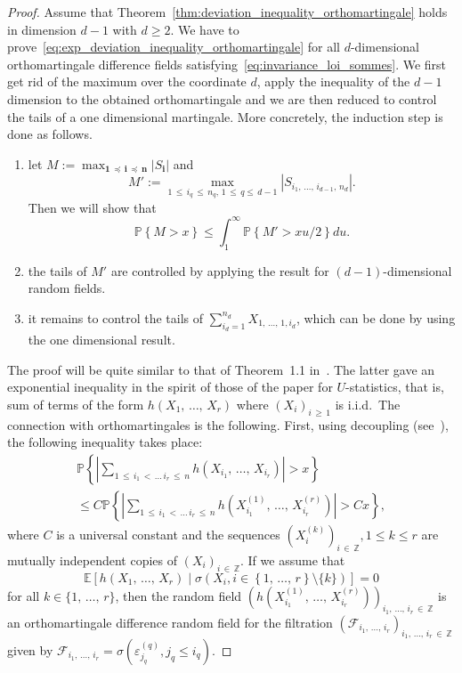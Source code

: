 \documentclass[AHL,Unicode,longabstracts,published]{cedram}
\newcommand{\Fca}{\mathcal{F}}
\newcommand\PP{\mathbb{P}}
\newcommand\Z{\mathbb{Z}}
\newcommand{\bbE}{\mathbb{E}}
\newcommand\ens[1]{\{ #1\}}
\newcommand\abs[1]{|#1|}
\newcommand{\pr}[1]{(#1)}
\newcommand\eps{\varepsilon}
\newcommand{\gr}[1]{\bm{#1}}
\newcommand{\gri}{\bm{i}}
\newcommand{\imd}{\preccurlyeq}
\newcommand*{\stepenumi}{\renewcommand*{\theenumi}{Step~\arabic{enumi}}}
\begin{document}
\begin{proof}
Assume that Theorem~\ref{thm:deviation_inequality_orthomartingale} holds in dimension $d-1$ with $d\geq 2$. We have to prove~\eqref{eq:exp_deviation_inequality_orthomartingale} for all $d$-dimensional orthomartingale difference fields satisfying~\eqref{eq:invariance_loi_sommes}. We first get rid of the maximum over the coordinate $d$, apply the inequality of the $d-1$ dimension to the obtained orthomartingale and we are then reduced to control the tails of a one dimensional martingale. More concretely, the induction step is done as follows.
\begin{enumerate}\stepenumi
\item\label{step1} let $M:=\max_{\gr{1}\,\imd\,\gri\,\imd\,\gr{n} } \abs{S_{\gri} }$ and
\begin{equation}
M':=\max_{1\,\leq\,i_q\,\leq\,n_q,\,1\,\leq\,q\leq\,d-1}
\left|S_{i_1,\,\dots,\,i_{d-1},\,n_d}\right|.
\end{equation}
Then we will show that
\begin{equation}
\PP\left\{M>x\right\}\leq \int_1^\infty\PP\left\{M'>xu/2\right\}du.
\end{equation}
\item\label{step2} the tails of $M'$ are controlled by applying the result for $\pr{d-1}$-dimensional random fields.
\item\label{step3} it remains to control the tails of $\sum_{i_d=1}^{n_d}X_{1,\,\dots,\,1,i_d}$, which can be done by using the one dimensional result.
\end{enumerate}


The proof will be quite similar to that of Theorem~1.1 in~\cite{MR4466386}. The latter gave an exponential inequality in the spirit of those of the paper for $U$-statistics, that is, sum of terms of the form $h\pr{X_1,\,\dots,\,X_r}$ where $\pr{X_i}_{i\,\geq\,1}$ is i.i.d.\ The connection with orthomartingales is the following. First, using decoupling (see~\cite{MR1334173}), the following inequality takes place:
\begin{multline}
\PP\left\{\left|\sum_{1\,\leq\,i_1\,<\,\dots\,i_r\,\leq\,n} h\left(X_{i_1},\,\dots,\,X_{i_r}\right) \right|>x\right\}\\
\leq C\PP\left\{\left|\sum_{1\,\leq\, i_1\,<\,\dots\,i_r\,\leq\,n} h\left(X_{i_1}^{\pr{1}},\,\dots,\,X_{i_r}^{\pr{r}}\right) \right|>Cx\right\},
\end{multline}
where $C$ is a universal constant and the sequences $\pr{X_i^{\pr{k}}}_{i\,\in\,\Z}, 1\leq k\leq r$ are mutually independent copies of $\pr{X_i}_{i\,\in\,\Z}$. If we assume that
\[
\bbE\left[h\left(X_1,\,\dots,\,X_r\right)\mid \sigma\left(X_i, i\in\left\{1,\,\dots,\,r\right\}\setminus \ens{k}\right)\right]=0
\]
for all $k\in \ens{1,\,\dots,\,r}$, then the random field $\pr{ h\pr{X_{i_1}^{\pr{1}},\,\dots,\,X_{i_r}^{\pr{r}}}}_{ i_1,\,\dots,\,i_r\,\in\,\Z}$ is an orthomartingale difference random field for the filtration $\pr{\Fca_{i_1,\,\dots,\,i_r}}_{i_1,\,\dots,\,i_r\,\in\,\Z}$ given by $\Fca_{i_1,\,\dots,\,i_r}=\sigma\pr{\eps_{j_q}^{\pr{q}}, j_q\leq i_q}$.


\end{proof}
\end{document}

